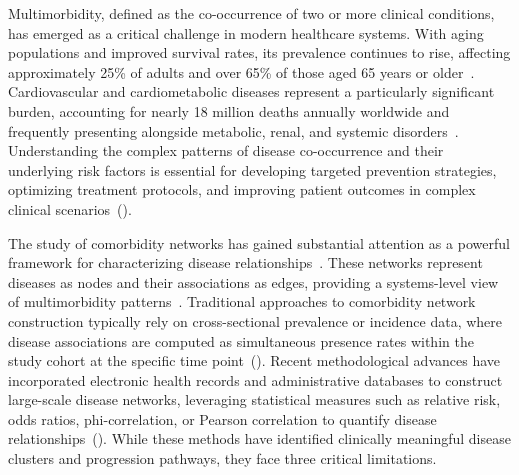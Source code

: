 Multimorbidity, defined as the co-occurrence of two or more clinical conditions, has emerged as a critical challenge in modern healthcare systems. With aging populations and improved survival rates, its prevalence continues to rise, affecting approximately 25\% of adults and over 65\% of those aged 65 years or older~\citet{barnett2012epidemiology}. Cardiovascular and cardiometabolic diseases represent a particularly significant burden, accounting for nearly 18 million deaths annually worldwide and frequently presenting alongside metabolic, renal, and systemic disorders~\citet{roth2020global}. Understanding the complex patterns of disease co-occurrence and their underlying risk factors is essential for developing targeted prevention strategies, optimizing treatment protocols, and improving patient outcomes in complex clinical scenarios~(\citealp{PradosTorres2014, Yan2022}). %

The study of comorbidity networks has gained substantial attention as a powerful framework for characterizing disease relationships~\citet{DelValle2019}. These networks represent diseases as nodes and their associations as edges, providing a systems-level view of multimorbidity patterns~\citet{Barabasi2011}. Traditional approaches to comorbidity network construction typically rely on cross-sectional prevalence or incidence data, where disease associations are computed as simultaneous presence rates within the study cohort at the specific time point~(\citealp{hidalgo2009dynamic, goh2007human}). Recent methodological advances have incorporated electronic health records and administrative databases to construct large-scale disease networks, leveraging statistical measures such as relative risk, odds ratios, phi-correlation, or Pearson correlation to quantify disease relationships~(\citealp{jensen2014temporal, siggaard2020disease, VargasFernandez2026Network, Burke2023}). While these methods have identified clinically meaningful disease clusters and progression pathways, they face three critical limitations.


